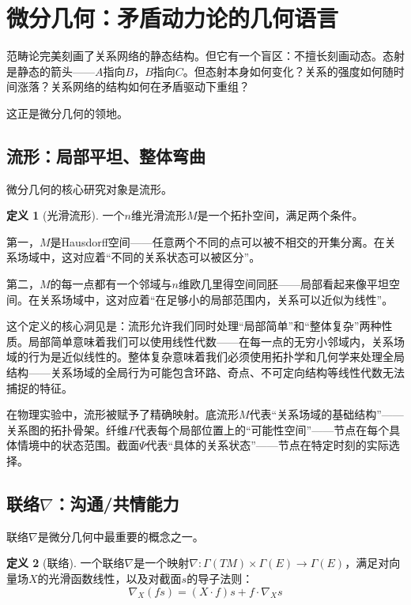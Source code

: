 \documentclass[11pt,a4paper]{book}
\theoremstyle{definition}
\newtheorem{definition}{定义}[chapter]
\begin{document}
\section{微分几何：矛盾动力论的几何语言}

范畴论完美刻画了关系网络的静态结构。但它有一个盲区：不擅长刻画动态。态射是静态的箭头——$A$指向$B$，$B$指向$C$。但态射本身如何变化？关系的强度如何随时间涨落？关系网络的结构如何在矛盾驱动下重组？

这正是微分几何的领地。

\subsection{流形：局部平坦、整体弯曲}

微分几何的核心研究对象是流形。

\begin{definition}[光滑流形]
一个$n$维光滑流形$M$是一个拓扑空间，满足两个条件。

第一，$M$是Hausdorff空间——任意两个不同的点可以被不相交的开集分离。在关系场域中，这对应着“不同的关系状态可以被区分”。

第二，$M$的每一点都有一个邻域与$n$维欧几里得空间同胚——局部看起来像平坦空间。在关系场域中，这对应着“在足够小的局部范围内，关系可以近似为线性”。
\end{definition}

这个定义的核心洞见是：流形允许我们同时处理“局部简单”和“整体复杂”两种性质。局部简单意味着我们可以使用线性代数——在每一点的无穷小邻域内，关系场域的行为是近似线性的。整体复杂意味着我们必须使用拓扑学和几何学来处理全局结构——关系场域的全局行为可能包含环路、奇点、不可定向结构等线性代数无法捕捉的特征。

在物理实验中，流形被赋予了精确映射。底流形$M$代表“关系场域的基础结构”——关系图的拓扑骨架。纤维$F$代表每个局部位置上的“可能性空间”——节点在每个具体情境中的状态范围。截面$\Psi$代表“具体的关系状态”——节点在特定时刻的实际选择。

\subsection{联络$\nabla$：沟通/共情能力}

联络$\nabla$是微分几何中最重要的概念之一。

\begin{definition}[联络]
一个联络$\nabla$是一个映射$\nabla: \Gamma(TM) \times \Gamma(E) \to \Gamma(E)$，满足对向量场$X$的光滑函数线性，以及对截面$s$的导子法则：
\begin{equation}
\nabla_X(fs) = (X \cdot f)s + f \cdot \nabla_X s
\end{equation}
\end{definition}
\end{document}
